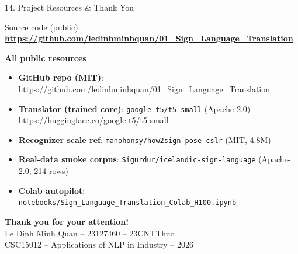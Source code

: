 \documentclass[10pt,aspectratio=169]{beamer}
\begin{document}
\begin{frame}{14. Project Resources \& Thank You}
\begin{block}{Source code (public)}
\centering
\large \textbf{\url{https://github.com/ledinhminhquan/01_Sign_Language_Translation}}
\end{block}

\textbf{All public resources}
\begin{itemize}\scriptsize
  \item \textbf{GitHub repo (MIT)}: \tiny\url{https://github.com/ledinhminhquan/01_Sign_Language_Translation}
  \item \textbf{Translator (trained core)}: \tiny\texttt{google-t5/t5-small} (Apache-2.0) -- \url{https://huggingface.co/google-t5/t5-small}
  \item \textbf{Recognizer scale ref}: \tiny\texttt{manohonsy/how2sign-pose-cslr} (MIT, 4.8M)
  \item \textbf{Real-data smoke corpus}: \tiny\texttt{Sigurdur/icelandic-sign-language} (Apache-2.0, 214 rows)
  \item \textbf{Colab autopilot}: \tiny\texttt{notebooks/Sign\_Language\_Translation\_Colab\_H100.ipynb}
\end{itemize}

\vspace{0.2cm}
\centering
\Large\textbf{Thank you for your attention!}\\[0.2cm]
\normalsize Le Dinh Minh Quan -- 23127460 -- 23CNTThuc \\
\small CSC15012 -- Applications of NLP in Industry -- 2026
\end{frame}
\end{document}
